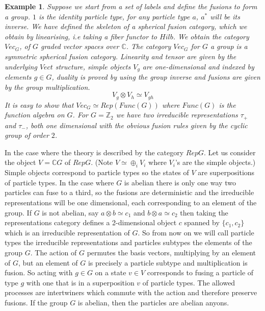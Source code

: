 \documentclass{article}
\newtheorem{example}{Example}
\newenvironment{remark}[1][Remark]{\begin{trivlist}
		\item[\hskip \labelsep {\bfseries #1}]}{\end{trivlist}}
\begin{document}
\begin{example}
	Suppose we start from a set of labels and define the fusions to form a group. $1$ is the identity particle type, for any particle type $a$, $a^*$ will be its inverse. We have defined the skeleton of a spherical fusion category, which we obtain by linearising, i.e taking a fiber functor to $Hilb$. We obtain the category $Vec_G$, of $G$ graded vector spaces over $\mathbb{C}$.
	The category $Vec_G$ for $G$ a group is a symmetric spherical fusion category. Linearity and tensor are given by the underlying $Vect$ structure, simple objects $V_g$ are one-dimensional and indexed by elements $g \in G$, duality is proved by using the group inverse and fusions are given by the group multiplication.
	$$V_g \otimes V_h \simeq V_{gh}$$
	It is easy to show that $Vec_G \simeq Rep(Func(G))$ where $Func(G)$ is the function algebra on $G$.
	For $G=\mathbb{Z}_2$ we have two irreducible representations $\tau_+$ and $\tau_-$, both one dimensional with the obvious fusion rules given by the cyclic group of order $2$.\\
\end{example}

\begin{remark}
	In the case where the theory is described by the category $RepG$.
	Let us consider the object $V=\mathbb{C}G$ of $RepG$. (Note $V \simeq \oplus_i V_i$ where $V_i$'s are the simple objects.) Simple objects correspond to particle types so the states of $V$ are superpositions of particle types. In the case where $G$ is abelian there is only one way two particles can fuse to a third, so the fusions are deterministic and the irreducible representations will be one dimensional, each corresponding to an element of the group. If $G$ is not abelian, say $a\otimes b \simeq c_1$ and $b \otimes a \simeq c_2$ then taking the representations category defines a 2-dimensional object $c$ spanned by $\{c_1,c_2\}$ which is an irreducible representation of $G$. So from now on we will call particle types the irreducible representations and particles subtypes the elements of the group $G$.  The action of $G$ permutes the basis vectors, multiplying by an element of $G$, but an element of $G$ is precisely a particle subtype and multiplication is fusion. So acting with $g \in G$ on a state $v \in V$ corresponds to fusing a particle of type $g$ with one that is in a superposition $v$ of particle types. The allowed processes are intertwiners which commute with the action and therefore preserve fusions. If the group $G$ is abelian, then the particles are abelian anyons.
\end{remark}
\end{document}
